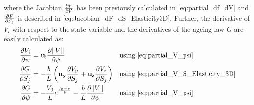 where the Jacobian $\pdv{F}{V}$ has been previously calculated in \autoref{eq:partial_df_dV} and $\pdv{F}{S_j}$ is described in \autoref{eq:Jacobian_dF_dS_Elasticity3D}. Further, the derivative of $V_i$ with respect to the state variable and the derivatives of the ageing law $G$ are easily calculated as:
\begin{align}
	\label{eq:partial_dV_dpsi_elasticity_3D}
	\pdv{V_i}{\psi} &= \mathbf{u_i}\pdv{\norm{V}}{\psi} & &\text{using \autoref{eq:partial_V_psi}} \\
	\pdv{G}{S_j}    &= -\frac{b}{L}\left(\mathbf{u_y}\pdv{V_y}{S_j} + \mathbf{u_z}\pdv{V_z}{S_j}\right) & &\text{using \autoref{eq:partial_V_S_Elasticity_3D}} \\
	\pdv{G}{\psi}    &= -\frac{V_0}{L}e^{\frac{f_0 - \psi}{b}} -\frac{b}{L}\pdv{\norm{V}}{\psi} & & \text{using \autoref{eq:partial_V_psi}}
\end{align}


